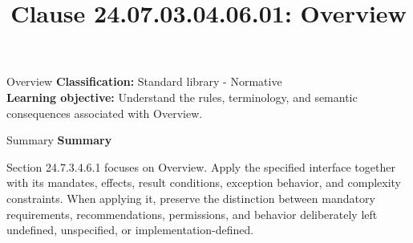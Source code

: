 \documentclass[10pt,letterpaper]{article}
\title{Clause 24.07.03.04.06.01: Overview}
\author{}
\date{}
\begin{document}
\maketitle
\begin{CornellOverviewBox}{Overview}
\textbf{Classification:} Standard library - Normative\\[2pt]
\textbf{Learning objective:} Understand the rules, terminology, and semantic consequences associated with Overview.
\end{CornellOverviewBox}\begin{CornellSummaryBox}{Summary}
{\sffamily\bfseries\color{Accent} Summary}\par\vspace{3pt}Section 24.7.3.4.6.1 focuses on Overview. Apply the specified interface together with its mandates, effects, result conditions, exception behavior, and complexity constraints. When applying it, preserve the distinction between mandatory requirements, recommendations, permissions, and behavior deliberately left undefined, unspecified, or implementation-defined.
\end{CornellSummaryBox}
\end{document}
